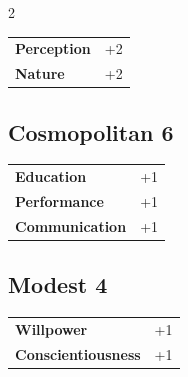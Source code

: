 \begin{multicols}{2}
\begin{tcolorbox}
\begin{tabular}{@{}ll@{}}
    \textbf{Perception} & +2\\
    \textbf{Nature} & +2\\
\end{tabular}


\end{tcolorbox}

\begin{tcolorbox}
    \subsection*{Cosmopolitan \hfill \small{6 }}
    \tcblower




\begin{tabular}{@{}ll@{}}
    \textbf{Education} & +1\\
    \textbf{Performance} & +1\\
    \textbf{Communication} & +1\\
\end{tabular}


\end{tcolorbox}

\begin{tcolorbox}
    \subsection*{Modest \hfill \small{4 }}
    \tcblower




\begin{tabular}{@{}ll@{}}
    \textbf{Willpower} & +1\\
    \textbf{Conscientiousness} & +1\\
\end{tabular}


\end{tcolorbox}
\end{multicols}
